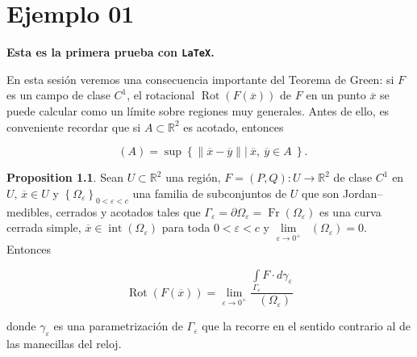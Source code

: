 \documentclass[
]{krantz}
\theoremstyle{definition}
\renewcommand{\epsilon}{\varepsilon}  %
\newtheorem{proposition}{Proposition}[chapter]
\theoremstyle{definition}
\theoremstyle{definition}
\theoremstyle{definition}
\theoremstyle{remark}
\begin{document}
\hypertarget{ejemplo-01}{%
\chapter{Ejemplo 01}\label{ejemplo-01}}

\textbf{Esta es la primera prueba con \texttt{LaTeX}.}

En esta sesión veremos una consecuencia importante del Teorema de Green: si \(F\) es un campo de clase \(C^1\), el rotacional \(\mathop{\mathrm{Rot}}\left( F(\overline{x}) \right)\) de \(F\) en un punto \(\overline{x}\) se puede calcular como un límite sobre regiones muy generales. Antes de ello, es conveniente recordar que si \(A\subset\mathbb{R}^2\) es acotado, entonces

\begin{equation*}
        \mathop{\mathrm{di\acute{a}m}}(A) = \sup \left\{ \|\overline{x} - \overline{y}\| \left\lvert \ \overline{x},\ \overline{y}\in A \right.  \  \right\} .
\end{equation*}

\begin{proposition}
\protect\hypertarget{prp:prop01}{}{\label{prp:prop01} }Sean \(U\subset\mathbb{R}^2\) una región, \(F = \left(P, Q\right): U\to \mathbb{R}^2\) de clase \(C^1\) en \(U\), \(\overline{x}\in U\) y \(\left\{ \Omega_{\epsilon} \right\}_{0<\epsilon <c}\) una familia de subconjuntos de \(U\) que son Jordan--medibles, cerrados y acotados tales que \(\Gamma_{\epsilon} = \partial \Omega_{\epsilon} = \mathop{\mathrm{Fr}}\left( \Omega_{\epsilon}\right)\) es una curva cerrada simple, \(\overline{x}\in\mathop{\mathrm{int}}\left(\Omega_{\epsilon}\right)\) para toda \(0 < \epsilon < c\) y \(\lim\limits_{\epsilon\to 0^{+}} \mathop{\mathrm{di\acute{a}m}}\left(\Omega_{\epsilon}\right) = 0\). Entonces

\begin{equation*}
            \mathop{\mathrm{Rot}}\left( F(\overline{x})\right) = \lim\limits_{\epsilon\to 0^{+}} \frac{\displaystyle\int\limits_{\Gamma_{\epsilon}} F\cdot d\gamma_{\epsilon}}{\mathop{\mathrm{\acute{a}rea}}\left( \Omega_{\epsilon}\right)}
\end{equation*}

donde \(\gamma_{\epsilon}\) es una parametrización de \(\Gamma_{\epsilon}\) que la recorre en el sentido contrario al de las manecillas del reloj.
\end{proposition}
\end{document}
